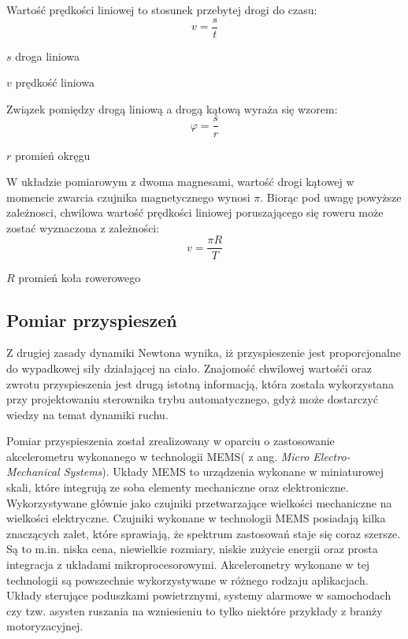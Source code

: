 Wartość prędkości liniowej to stosunek przebytej drogi do czasu:
\begin{equation}
v = \frac{s}{t}
\end{equation}
\begin{eqwhere}[2cm]
	\item[$s$] droga liniowa
	\item[$v$] prędkość liniowa
\end{eqwhere}
 Związek pomiędzy drogą liniową a drogą kątową wyraża się wzorem:
\begin{equation}
\varphi = \frac{s}{r}
\end{equation}
\begin{eqwhere}[2cm]
	\item[$r$] promień okręgu
\end{eqwhere}
W układzie pomiarowym z dwoma magnesami, wartość drogi kątowej w momencie zwarcia czujnika magnetycznego wynosi $\pi$. Biorąc pod uwagę powyższe zależnosci, chwilowa wartość prędkości liniowej poruszającego się roweru może zostać wyznaczona z zależności:
 \begin{equation}
v = \frac{\pi R}{T}
\end{equation}
\begin{eqwhere}[2cm]
	\item[$R$] promień koła rowerowego
\end{eqwhere}
\subsection{Pomiar przyspieszeń}
Z drugiej zasady dynamiki Newtona wynika, iż przyspieszenie jest proporcjonalne do wypadkowej siły działającej na ciało. Znajomość chwilowej wartośći oraz zwrotu przyspieszenia jest drugą istotną informacją, która została wykorzystana przy projektowaniu sterownika trybu automatycznego, gdyż może dostarczyć wiedzy na temat dynamiki ruchu.

Pomiar przyspieszenia został zrealizowany w oparciu o zastosowanie akcelerometru wykonanego w technologii MEMS( z ang. {\em Micro Electro-Mechanical Systems}). Układy MEMS to urządzenia wykonane w miniaturowej skali, które integrują ze soba elementy mechaniczne oraz elektroniczne. Wykorzystywane głównie jako czujniki przetwarzające wielkości mechaniczne na wielkości elektryczne. Czujniki wykonane w technologii MEMS posiadają kilka znaczących zalet, które sprawiają, że spektrum zastosowań staje się coraz szersze. Są to m.in. niska cena, niewielkie rozmiary, niskie zużycie energii oraz prosta integracja z układami mikroprocesorowymi. Akcelerometry wykonane w tej technologii są powszechnie wykorzystywane w różnego rodzaju aplikacjach. Układy sterujące poduszkami powietrznymi, systemy alarmowe w samochodach czy tzw. asysten ruszania na wzniesieniu to tylko niektóre przykłady z branży motoryzacyjnej.

